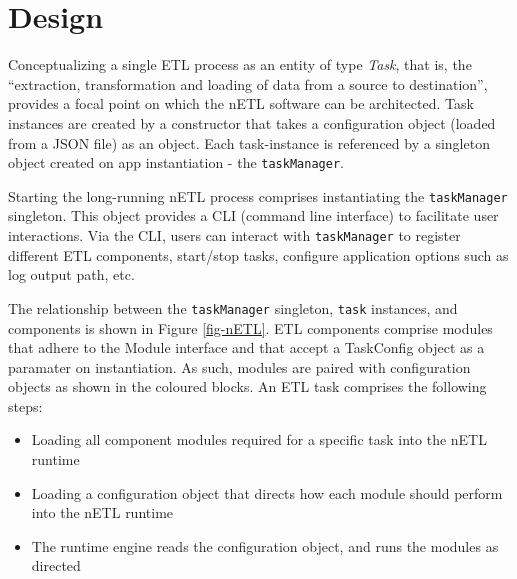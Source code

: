 \section{Design}
Conceptualizing a single ETL process as an entity of type \textit{Task}, that is, the ``extraction, transformation and loading of data from a source to destination'', provides a focal point on which the nETL software can be architected. Task instances are created by a constructor that takes a configuration object (loaded from a JSON file) as an object. Each task-instance is referenced by a singleton object created on app instantiation - the \texttt{taskManager}.

Starting the long-running nETL process comprises instantiating the \texttt{taskManager} singleton. This object provides a CLI (command line interface) to facilitate user interactions. Via the CLI, users can interact with \texttt{taskManager} to register different ETL components, start/stop tasks, configure application options such as log output path, etc.

The relationship between the \texttt{taskManager} singleton, \texttt{task} instances, and components is shown in Figure \ref{fig-nETL}. ETL components comprise modules that adhere to the Module interface and that accept a TaskConfig object as a paramater on instantiation. As such, modules are paired with configuration objects as shown in the coloured blocks. An ETL task comprises the following steps:

\begin{itemize}
    \item Loading all component modules required for a specific task into the nETL runtime
    \item Loading a configuration object that directs how each module should perform into the nETL runtime
    \item The runtime engine reads the configuration object, and runs the modules as directed
\end{itemize}

